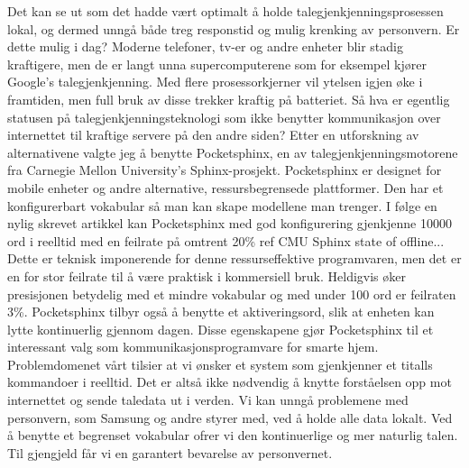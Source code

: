 Det kan se ut som det hadde vært optimalt å holde talegjenkjenningsprosessen lokal, og dermed unngå både treg responstid og mulig krenking av personvern. Er dette mulig i dag? Moderne telefoner, tv-er og andre enheter blir stadig kraftigere, men de er langt unna supercomputerene som for eksempel kjører Google's talegjenkjenning. Med flere prosessorkjerner vil ytelsen igjen øke i framtiden, men full bruk av disse trekker kraftig på batteriet. Så hva er egentlig statusen på talegjenkjenningsteknologi som ikke benytter kommunikasjon over internettet til kraftige servere på den andre siden? Etter en utforskning av alternativene valgte jeg å benytte Pocketsphinx, en av talegjenkjenningsmotorene fra Carnegie Mellon University's Sphinx-prosjekt. Pocketsphinx er designet for mobile enheter og andre alternative, ressursbegrensede plattformer. Den har et konfigurerbart vokabular så man kan skape modellene man trenger. I følge en nylig skrevet artikkel kan Pocketsphinx med god konfigurering gjenkjenne 10000 ord i reelltid med en feilrate på omtrent 20\% {\color{red}ref CMU Sphinx state of offline..}. Dette er teknisk imponerende for denne ressurseffektive programvaren, men det er en for stor feilrate til å være praktisk i kommersiell bruk. Heldigvis øker presisjonen betydelig med et mindre vokabular og med under 100 ord er feilraten 3\%. Pocketsphinx tilbyr også å benytte et aktiveringsord, slik at enheten kan lytte kontinuerlig gjennom dagen. Disse egenskapene gjør Pocketsphinx til et interessant valg som kommunikasjonsprogramvare for smarte hjem. Problemdomenet vårt tilsier at vi ønsker et system som gjenkjenner et titalls kommandoer i reelltid. Det er altså ikke nødvendig å knytte forståelsen opp mot internettet og sende taledata ut i verden. Vi kan unngå problemene med personvern, som Samsung og andre styrer med, ved å holde alle data lokalt. Ved å benytte et begrenset vokabular ofrer vi den kontinuerlige og mer naturlig talen. Til gjengjeld får vi en garantert bevarelse av personvernet.


